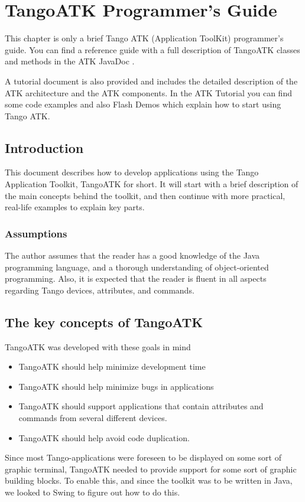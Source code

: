 
\chapter{TangoATK Programmer's Guide}

This chapter is only a brief Tango ATK (Application ToolKit) programmer's
guide. You can find a reference guide with a full description of TangoATK
classes and methods in the ATK JavaDoc \cite{ATK-doc}.

A tutorial document \cite{ATK-Tutorial} is also provided and includes
the detailed description of the ATK architecture and the ATK components.
In the ATK Tutorial \cite{ATK-Tutorial} you can find some code examples
and also Flash Demos which explain how to start using Tango ATK.


\section{Introduction}

This document describes how to develop applications using the Tango
Application Toolkit, TangoATK for short. It will start with a brief
description of the main concepts behind the toolkit, and then continue
with more practical, real-life examples to explain key parts.


\subsection{Assumptions}

The author assumes that the reader has a good knowledge of the Java
programming language, and a thorough understanding of object-oriented
programming. Also, it is expected that the reader is fluent in all
aspects regarding Tango devices, attributes, and commands.


\section{The key concepts of TangoATK}

TangoATK was developed with these goals in mind
\begin{itemize}
\item TangoATK should help minimize development time 
\item TangoATK should help minimize bugs in applications 
\item TangoATK should support applications that contain attributes and commands
from several different devices. 
\item TangoATK should help avoid code duplication. 
\end{itemize}
Since most Tango-applications were foreseen to be displayed on some
sort of graphic terminal, TangoATK needed to provide support for some
sort of graphic building blocks. To enable this, and since the toolkit
was to be written in Java, we looked to Swing to figure out how to
do this.

